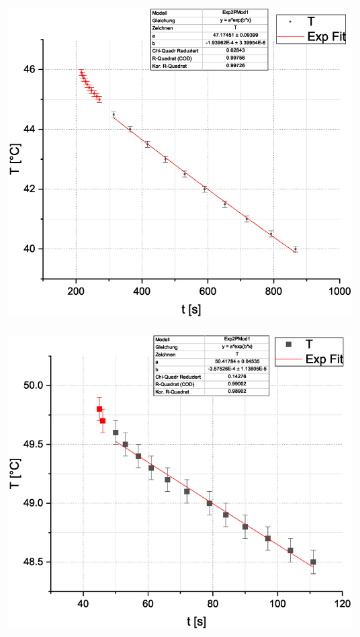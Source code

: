 \documentclass[10pt,a4paper]{article}
\begin{document}
\begin{figure}[H]
\centering
\begin{subfigure}[c]{.5\textwidth}
\centering
\includegraphics[scale=0.3]{Reihe1}
\label{fig:r1}
\end{subfigure}%
%
\begin{subfigure}[c]{.5\textwidth}
\centering
\includegraphics[scale=0.3]{Reihe2}
\label{fig:r2}
\end{subfigure}%


\end{figure}
\end{document}
